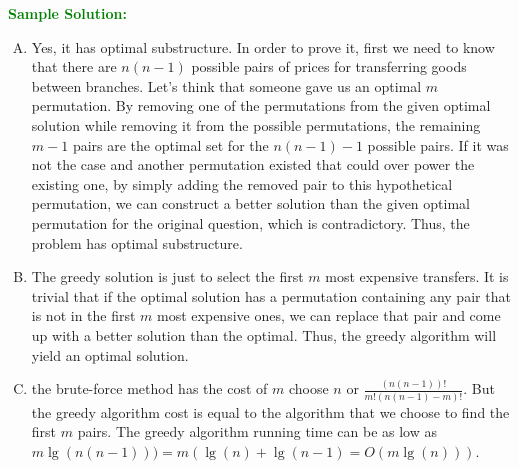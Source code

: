 \textcolor{Green}{\textbf{Sample Solution:}}
\begin{enumerate}[A.]
	\item Yes, it has optimal substructure. In order to prove it, first we need to know that there are $n(n-1)$ possible pairs of prices for transferring goods between branches. Let's think that someone gave us an optimal $m$ permutation. By removing one of the permutations from the given optimal solution while removing it from the possible permutations, the remaining $m-1$ pairs are the optimal set for the $n(n-1)-1$ possible pairs. If it was not the case and another permutation existed that could over power the existing one, by simply adding the removed pair to this hypothetical permutation, we can construct a better solution than the given optimal permutation for the original question, which is contradictory. Thus, the problem has optimal substructure.
	\item The greedy solution is just to select the first $m$ most expensive transfers. It is trivial that if the optimal solution has a permutation containing any pair that is not in the first $m$ most expensive ones, we can replace that pair and come up with a better solution than the optimal. Thus, the greedy algorithm will yield an optimal solution.
	\item the brute-force method has the cost of $m$ choose $n$ or $\frac{(n(n-1))!}{m!(n(n-1)-m)!}$. But the greedy algorithm cost is equal to the algorithm that we choose to find the first $m$ pairs. The greedy algorithm running time can be as low as $m \lg(n(n-1))) = m(\lg(n) + \lg(n-1) = O(m\lg(n)))$.
\end{enumerate}

